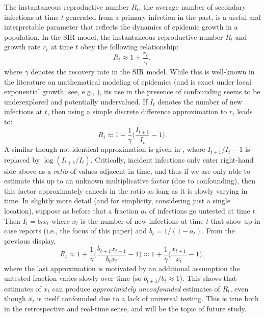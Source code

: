 \documentclass[sts]{imsart}
\theoremstyle{plain}
\theoremstyle{definition}
\theoremstyle{remark}
\begin{document}
The instantaneous reproductive number $R_t$, the average number of secondary
infections at time $t$ generated from a primary infection in the past, is a
useful and interpretable parameter that reflects the dynamics of epidemic growth
in a population. In the SIR model, the instantaneous reproductive number $R_t$
and growth rate $r_t$ at time $t$ obey the following relationship:
\[
R_t \approx 1 + \frac{r_t}{\gamma}, 
\] 
where $\gamma$ denotes the recovery rate in the SIR model. While this is
well-known in the literature on mathematical modeling of epidemics (and is exact
under local exponential growth; see, e.g., \citet{Wallinga:2007}), its use in
the presence of confounding seems to be underexplored and potentially
undervalued. If $I_t$ denotes the number of new infections at $t$, then using a
simple discrete difference approximation to $r_t$ leads to: 
\[
R_t \approx 1 + \frac{1}{\gamma}\bigg( \frac{I_{t+1}}{I_t} - 1 \bigg). 
\]
A similar though not identical approximation is given in
\citet{Bettencourt:2008}, where $I_{t+1}/I_t-1$ is replaced by
$\log(I_{t+1}/I_t)$. Critically, incident infections only enter right-hand side
above as a \emph{ratio} of values adjacent in time, and thus if we are only able
to estimate this up to an unknown multiplicative factor (due to confounding),
then this factor approximately cancels in the ratio as long as it is slowly
varying in time. In slightly more detail (and for simplicity, considering just a
single location), suppose as before that a fraction $a_t$ of infections go
untested at time $t$. Then $I_t = b_t x_t$ where $x_t$ is the number of new
infections at time $t$ that show up in case reports (i.e., the focus of this
paper) and $b_t = 1/(1-a_t)$. From the previous display,   
\[
R_t \approx 1 + \frac{1}{\gamma}\bigg( \frac{b_{t+1} x_{t+1}}{b_t x_t} - 1
\bigg) \approx 1 + \frac{1}{\gamma}\bigg( \frac{x_{t+1}}{x_t} - 1 \bigg),
\]
where the last approximation is motivated by an additional assumption the 
untested fraction varies slowly over time (so $b_{t+1}/b_t \approx
1$). This shows that estimates of $x_t$ can produce \emph{approximately
  unconfounded} estimates of $R_t$, even though $x_t$ is itself confounded
due to a lack of universal testing. This is true both in the retrospective and 
real-time sense, and will be the topic of future study.     

\end{document}
